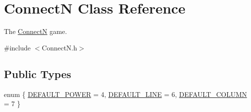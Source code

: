 \hypertarget{classConnectN}{\section{Connect\+N Class Reference}
\label{classConnectN}
}


The \hyperlink{classConnectN}{Connect\+N} game.  




{\ttfamily \#include $<$Connect\+N.\+h$>$}

\subsection*{Public Types}
\begin{DoxyCompactItemize}
\item 
enum \{ \hyperlink{classConnectN_afbc5b3f1ce192977e53400984d532d1ba8dabbd51219a23e08073e6c946755bc8}{D\+E\+F\+A\+U\+L\+T\+\_\+\+P\+O\+W\+E\+R} = 4, 
\hyperlink{classConnectN_afbc5b3f1ce192977e53400984d532d1bae24544d9408db101c664328a5c00137c}{D\+E\+F\+A\+U\+L\+T\+\_\+\+L\+I\+N\+E} = 6, 
\hyperlink{classConnectN_afbc5b3f1ce192977e53400984d532d1ba1ebbe9aa1e009f66a6c5c022f5ee0e50}{D\+E\+F\+A\+U\+L\+T\+\_\+\+C\+O\+L\+U\+M\+N} = 7
 \}
\end{DoxyCompactItemize}

